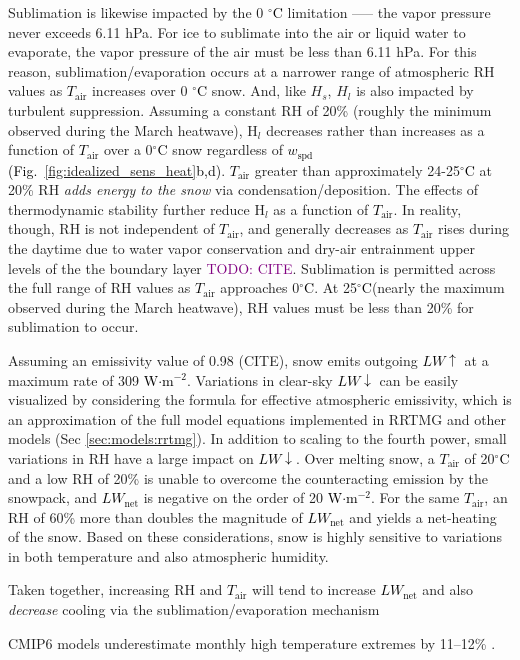 \documentclass[12pt]{iopjournal}
\newcommand{\fig}[2]{\textcolor{black}{(Fig.~\ref{#1}{#2})}}   %
\newcommand{\comment}[1]{\textcolor{purple}{TODO: #1}}      %
\newcommand{\tair}{\textcolor{black}{$T_{\mathrm{air}}$}\xspace}
\newcommand{\lwnet}{\textcolor{black}{$LW_{\mathrm{net}}$}\xspace}
\newcommand{\wspd}{\textcolor{black}{$w_{\mathrm{spd}}$}\xspace}
\newcommand{\lwup}{\textcolor{black}{$LW\uparrow$}\xspace}
\newcommand{\lwdn}{\textcolor{black}{$LW\downarrow$}\xspace}
\newcommand{\wmsq}{\textcolor{black}{W$\cdot$m$^{-2}$}\xspace}
\newcommand{\degrc}{\textcolor{black}{$^\circ$C}\xspace}
\begin{document}
Sublimation is likewise impacted by the 0 \degrc limitation —-- the vapor pressure never exceeds 6.11 hPa.
For ice to sublimate into the air or liquid water to evaporate, the vapor pressure of the air must be less than 6.11 hPa.
For this reason, sublimation/evaporation occurs at a narrower range of atmospheric RH values as \tair increases over 0 \degrc snow. 
And, like $H_s$, $H_l$ is also impacted by turbulent suppression.
Assuming a constant RH of 20\% (roughly the minimum observed during the March heatwave), H$_l$ decreases rather than increases as a function of \tair over a 0\degrc snow regardless of \wspd \fig{fig:idealized_sens_heat}{b,d}.
\tair greater than approximately 24-25\degrc at 20\% RH \textit{adds energy to the snow} via condensation/deposition.
The effects of thermodynamic stability further reduce H$_l$ as a function of \tair. 
In reality, though, RH is not independent of \tair, and generally decreases as \tair rises during the daytime due to water vapor conservation and dry-air entrainment upper levels of the the boundary layer \comment{CITE}. 
Sublimation is permitted across the full range of RH values as \tair approaches 0\degrc. 
At 25\degrc (nearly the maximum observed during the March heatwave), RH values must be less than 20\% for sublimation to occur.

Assuming an emissivity value of 0.98 (CITE), snow emits outgoing \lwup at a maximum rate of 309 \wmsq. 
Variations in clear-sky \lwdn can be easily visualized by considering the \cite{Brutsaert1975-jl} formula for effective atmospheric emissivity,  which is an approximation of the full model equations implemented in RRTMG and other models (Sec \ref{sec:models:rrtmg}).
In addition to scaling to the fourth power, small variations in RH have a large impact on \lwdn.
Over melting snow, a \tair of 20\degrc and a low RH of 20\% is unable to overcome the counteracting emission by the snowpack, and \lwnet is negative on the order of 20 \wmsq.
For the same \tair, an RH of 60\% more than doubles the magnitude of \lwnet and yields a net-heating of the snow.
Based on these considerations, snow is highly sensitive to variations in both temperature and also atmospheric humidity. 

Taken together, increasing RH and \tair will tend to increase \lwnet and also \textit{decrease} cooling via the sublimation/evaporation mechanism


CMIP6 models underestimate monthly high temperature extremes by 11–12\% \citep{Duan2025-rl}.
\end{document}
